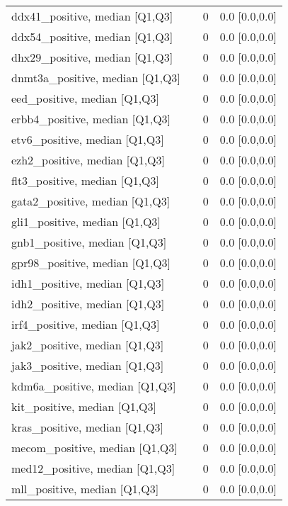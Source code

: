 \begin{tabular}{llll}
ddx41\_positive, median [Q1,Q3] &     &      0 &     0.0 [0.0,0.0] \\
ddx54\_positive, median [Q1,Q3] &     &      0 &     0.0 [0.0,0.0] \\
dhx29\_positive, median [Q1,Q3] &     &      0 &     0.0 [0.0,0.0] \\
dnmt3a\_positive, median [Q1,Q3] &     &      0 &     0.0 [0.0,0.0] \\
eed\_positive, median [Q1,Q3] &     &      0 &     0.0 [0.0,0.0] \\
erbb4\_positive, median [Q1,Q3] &     &      0 &     0.0 [0.0,0.0] \\
etv6\_positive, median [Q1,Q3] &     &      0 &     0.0 [0.0,0.0] \\
ezh2\_positive, median [Q1,Q3] &     &      0 &     0.0 [0.0,0.0] \\
flt3\_positive, median [Q1,Q3] &     &      0 &     0.0 [0.0,0.0] \\
gata2\_positive, median [Q1,Q3] &     &      0 &     0.0 [0.0,0.0] \\
gli1\_positive, median [Q1,Q3] &     &      0 &     0.0 [0.0,0.0] \\
gnb1\_positive, median [Q1,Q3] &     &      0 &     0.0 [0.0,0.0] \\
gpr98\_positive, median [Q1,Q3] &     &      0 &     0.0 [0.0,0.0] \\
idh1\_positive, median [Q1,Q3] &     &      0 &     0.0 [0.0,0.0] \\
idh2\_positive, median [Q1,Q3] &     &      0 &     0.0 [0.0,0.0] \\
irf4\_positive, median [Q1,Q3] &     &      0 &     0.0 [0.0,0.0] \\
jak2\_positive, median [Q1,Q3] &     &      0 &     0.0 [0.0,0.0] \\
jak3\_positive, median [Q1,Q3] &     &      0 &     0.0 [0.0,0.0] \\
kdm6a\_positive, median [Q1,Q3] &     &      0 &     0.0 [0.0,0.0] \\
kit\_positive, median [Q1,Q3] &     &      0 &     0.0 [0.0,0.0] \\
kras\_positive, median [Q1,Q3] &     &      0 &     0.0 [0.0,0.0] \\
mecom\_positive, median [Q1,Q3] &     &      0 &     0.0 [0.0,0.0] \\
med12\_positive, median [Q1,Q3] &     &      0 &     0.0 [0.0,0.0] \\
mll\_positive, median [Q1,Q3] &     &      0 &     0.0 [0.0,0.0] \\

\end{tabular}
